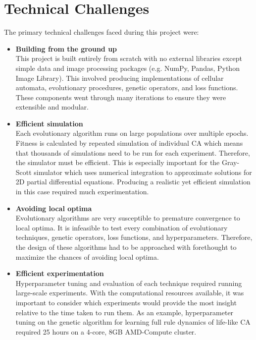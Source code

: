 
\section{Technical Challenges}
The primary technical challenges faced during this project were:
\begin{itemize}
    \item \textbf{Building from the ground up}\\ This project is built entirely from scratch with no external libraries except simple data and image processing packages (e.g. NumPy, Pandas, Python Image Library). This involved producing implementations of cellular automata, evolutionary procedures, genetic operators, and loss functions. These components went through many iterations to ensure they were extensible and modular.
    \item \textbf{Efficient simulation}\\ Each evolutionary algorithm runs on large populations over multiple epochs. Fitness is calculated by repeated simulation of individual CA which means that thousands of simulations need to be run for each experiment. Therefore, the simulator must be efficient. This is especially important for the Gray-Scott simulator which uses numerical integration to approximate solutions for 2D partial differential equations. Producing a realistic yet efficient simulation in this case required much experimentation.
    \item \textbf{Avoiding local optima}\\ Evolutionary algorithms are very susceptible to premature convergence to local optima. It is infeasible to test every combination of evolutionary techniques, genetic operators, loss functions, and hyperparameters. Therefore, the design of these algorithms had to be approached with forethought to maximize the chances of avoiding local optima. 
    \item \textbf{Efficient experimentation}\\ Hyperparameter tuning and evaluation of each technique required running large-scale experiments. With the computational resources available, it was important to consider which experiments would provide the most insight relative to the time taken to run them. As an example, hyperparameter tuning on the genetic algorithm for learning full rule dynamics of life-like CA required 25 hours on a 4-core, 8GB AMD-Compute cluster. 
\end{itemize}

